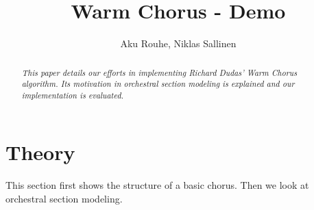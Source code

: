 \documentclass[11pt,a4paper,twoside]{article}
\title{Warm Chorus -  Demo}
\author{Aku Rouhe, Niklas Sallinen}
\begin{document}
\maketitle

\begin{abstract}
\noindent\it This paper details our efforts in implementing Richard Dudas' Warm Chorus algorithm. Its motivation in orchestral section modeling is explained and our implementation is evaluated. 
\end{abstract}



\clearpage
\section{Theory}
This section first shows the structure of a basic chorus. Then we look at orchestral section modeling.



\clearpage






\clearpage





\clearpage




\clearpage



\end{document}
